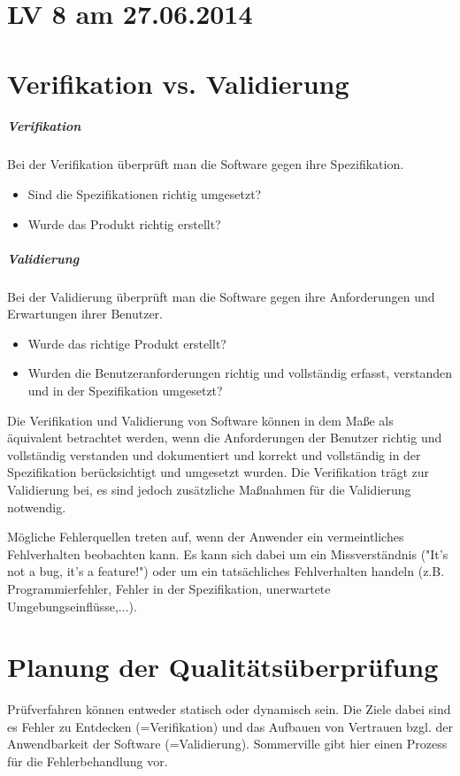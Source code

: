 \chapter{LV 8 am 27.06.2014}
\chapter{Verifikation vs. Validierung}
\paragraph{Verifikation}
Bei der Verifikation überprüft man die Software gegen ihre Spezifikation.
\begin{itemize}
\item Sind die Spezifikationen richtig umgesetzt?
\item Wurde das Produkt richtig erstellt?
\end{itemize}

\paragraph{Validierung}
Bei der Validierung überprüft man die Software gegen ihre Anforderungen und Erwartungen ihrer Benutzer.
\begin{itemize}
\item Wurde das richtige Produkt erstellt?
\item Wurden die Benutzeranforderungen richtig und vollständig erfasst, verstanden und in der Spezifikation umgesetzt?
\end{itemize}

Die Verifikation und Validierung von Software können in dem Maße als äquivalent betrachtet werden, wenn die Anforderungen der Benutzer richtig und vollständig verstanden und dokumentiert und korrekt und vollständig in der Spezifikation berücksichtigt und umgesetzt wurden.
Die Verifikation trägt zur Validierung bei, es sind jedoch zusätzliche Maßnahmen für die Validierung notwendig.

Mögliche Fehlerquellen treten auf, wenn der Anwender ein vermeintliches Fehlverhalten beobachten kann. Es kann sich dabei um ein Missverständnis ("It's not a bug, it's a feature!") oder um ein tatsächliches Fehlverhalten handeln (z.B. Programmierfehler, Fehler in der Spezifikation, unerwartete Umgebungseinflüsse,...).

\chapter{Planung der Qualitätsüberprüfung}
Prüfverfahren können entweder statisch oder dynamisch sein. Die Ziele dabei sind es Fehler zu Entdecken (=Verifikation) und das Aufbauen von Vertrauen bzgl. der Anwendbarkeit der Software (=Validierung).
Sommerville gibt hier einen Prozess für die Fehlerbehandlung vor.

